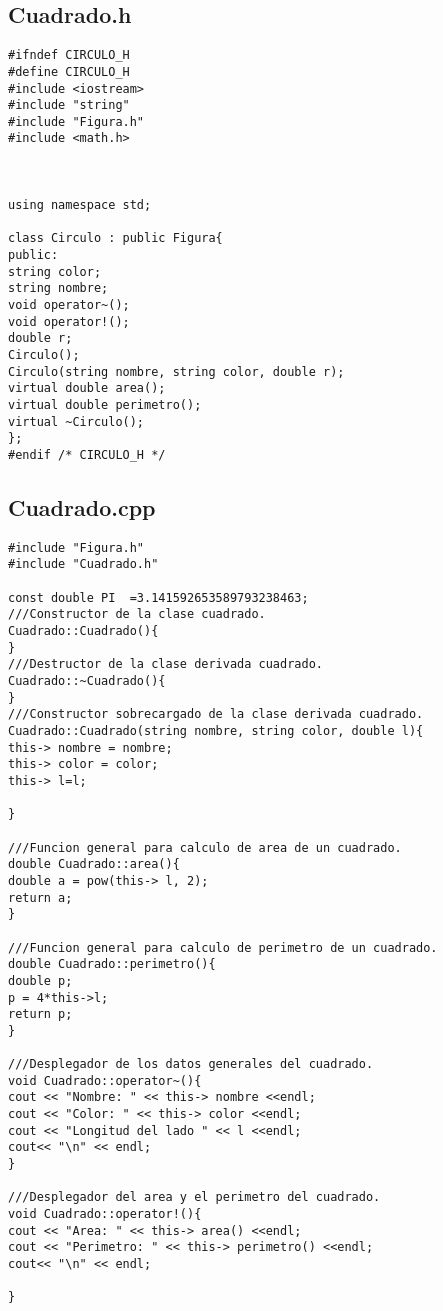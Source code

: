 \documentclass[11pt]{article}
\begin{document}
\subsection{Cuadrado.h}
\begin{lstlisting}
#ifndef CIRCULO_H
#define CIRCULO_H
#include <iostream>
#include "string"
#include "Figura.h"
#include <math.h> 



using namespace std;

class Circulo : public Figura{
public:
string color;
string nombre;
void operator~();
void operator!();
double r;
Circulo();
Circulo(string nombre, string color, double r);
virtual double area();
virtual double perimetro();
virtual ~Circulo();
};
#endif /* CIRCULO_H */

\end{lstlisting}

\subsection{Cuadrado.cpp}
\begin{lstlisting}
#include "Figura.h"
#include "Cuadrado.h"

const double PI  =3.141592653589793238463;
///Constructor de la clase cuadrado.
Cuadrado::Cuadrado(){
}
///Destructor de la clase derivada cuadrado.
Cuadrado::~Cuadrado(){
}
///Constructor sobrecargado de la clase derivada cuadrado.
Cuadrado::Cuadrado(string nombre, string color, double l){
this-> nombre = nombre;
this-> color = color;
this-> l=l;

}

///Funcion general para calculo de area de un cuadrado.
double Cuadrado::area(){
double a = pow(this-> l, 2);
return a;
}

///Funcion general para calculo de perimetro de un cuadrado.
double Cuadrado::perimetro(){
double p;
p = 4*this->l;
return p;
}

///Desplegador de los datos generales del cuadrado.
void Cuadrado::operator~(){
cout << "Nombre: " << this-> nombre <<endl;
cout << "Color: " << this-> color <<endl;
cout << "Longitud del lado " << l <<endl;
cout<< "\n" << endl;
}

///Desplegador del area y el perimetro del cuadrado.
void Cuadrado::operator!(){
cout << "Area: " << this-> area() <<endl;
cout << "Perimetro: " << this-> perimetro() <<endl;
cout<< "\n" << endl;

}

\end{lstlisting}
\end{document}
